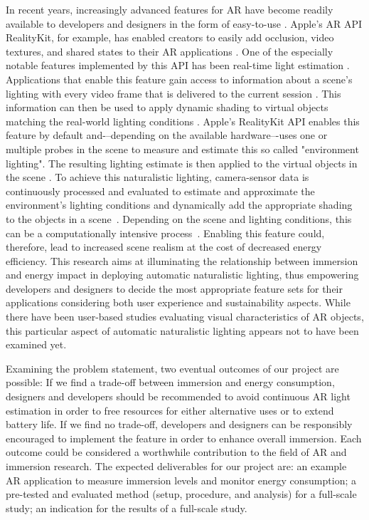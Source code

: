 \documentclass[12pt,twoside,english]{article}
\begin{document}
In recent years, increasingly advanced features for \gls{AR} have become readily available to developers and designers in the form of easy-to-use .
Apple's \gls{AR} \gls{API} RealityKit, for example, has enabled creators to easily add occlusion, video textures, and shared states to their \gls{AR} applications \cite{apple_realitykit_2020-1}.
One of the especially notable features implemented by this \gls{API} has been real-time light estimation \cite{apple_arlightestimate_2020}.
Applications that enable this feature gain access to information about a scene's lighting with every video frame that is delivered to the current session \cite{apple_arlightestimate_2020}.
This information can then be used to apply dynamic shading to virtual objects matching the real-world lighting conditions \cite{apple_arlightestimate_2020}.
Apple's RealityKit \gls{API} enables this feature by default and-–depending on the available hardware–-uses one or multiple probes in the scene to measure and estimate this so called "environment lighting".
The resulting lighting estimate is then applied to the virtual objects in the scene \cite{apple_disablearenvironmentlighting_2020}.
To achieve this naturalistic lighting, camera-sensor data is continuously processed and evaluated to estimate and approximate the environment's lighting conditions and dynamically add the appropriate shading to the objects in a scene~\cite{apple_arlightestimate_2020,apple_disablearenvironmentlighting_2020}.
Depending on the scene and lighting conditions, this can be a computationally intensive process~\cite{steed_constructing_2016}.
Enabling this feature could, therefore, lead to increased scene realism at the cost of decreased energy efficiency.
This research aims at illuminating the relationship between immersion and energy impact in deploying automatic naturalistic lighting, thus empowering developers and designers to decide the most appropriate feature sets for their applications considering both user experience and sustainability aspects.
While there have been user-based studies evaluating visual characteristics of \gls{AR} objects, this particular aspect of automatic naturalistic lighting appears not to have been examined yet.


Examining the problem statement, two eventual outcomes of our project are possible:
If we find a trade-off between immersion and energy consumption, designers and developers should be recommended to avoid continuous \gls{AR} light estimation in order to free resources for either alternative uses or to extend battery life.
If we find no trade-off, developers and designers can be responsibly encouraged to implement the feature in order to enhance overall immersion.
Each outcome could be considered a worthwhile contribution to the field of \gls{AR} and immersion research.
The expected deliverables for our project are: an example \gls{AR} application to measure immersion levels and monitor energy consumption; a pre-tested and evaluated method (setup, procedure, and analysis) for a full-scale study; an indication for the results of a full-scale study.
\end{document}
